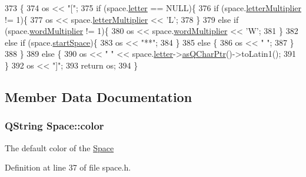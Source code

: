 \begin{DoxyCode}
373                                                      \{
374     os << \textcolor{stringliteral}{"["};
375     \textcolor{keywordflow}{if} (space.\hyperlink{class_space_ab899363fba4ab54c907df80a99e8e563}{letter} == NULL)\{
376         \textcolor{keywordflow}{if} (space.\hyperlink{class_space_a9bae20cdb32f38dd2386024db0443b22}{letterMultiplier} != 1)\{
377             os << space.\hyperlink{class_space_a9bae20cdb32f38dd2386024db0443b22}{letterMultiplier} << \textcolor{charliteral}{'L'};
378         \}
379         \textcolor{keywordflow}{else} \textcolor{keywordflow}{if} (space.\hyperlink{class_space_a00b205e763885903d7b8a811ae0daa54}{wordMultiplier} != 1)\{
380             os << space.\hyperlink{class_space_a00b205e763885903d7b8a811ae0daa54}{wordMultiplier} << \textcolor{charliteral}{'W'};
381         \}
382         \textcolor{keywordflow}{else} \textcolor{keywordflow}{if} (space.\hyperlink{class_space_aa135c863552d2a89de1f5e1410fb9450}{startSpace})\{
383             os << \textcolor{stringliteral}{"**"};
384         \}
385         \textcolor{keywordflow}{else} \{
386             os << \textcolor{stringliteral}{"  "};
387         \}
388     \}
389     \textcolor{keywordflow}{else} \{
390         os << \textcolor{stringliteral}{" "} << space.\hyperlink{class_space_ab899363fba4ab54c907df80a99e8e563}{letter}->\hyperlink{class_letter_aa7fb6547b5ceefef8d0a014ab0a80d08}{asQCharPtr}()->toLatin1();
391     \}
392     os << \textcolor{stringliteral}{"]"};
393     \textcolor{keywordflow}{return} os;
394 \}
\end{DoxyCode}


\subsection{Member Data Documentation}
\hypertarget{class_space_aa26e0bcc52344b863a274af75651e454}{
\subsubsection[{color}]{\setlength{\rightskip}{0pt plus 5cm}Q\-String Space\-::color\hspace{0.3cm}{\ttfamily [private]}}}\label{class_space_aa26e0bcc52344b863a274af75651e454}
The default color of the \hyperlink{class_space}{Space} 

Definition at line 37 of file space.\-h.




